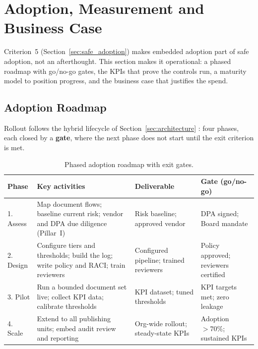 \documentclass[12pt,a4paper]{article}
\begin{document}
\section{Adoption, Measurement and Business Case}
\label{sec:adoption}

Criterion~5 (Section~\ref{sec:safe_adoption}) makes embedded adoption part of safe adoption, not an afterthought. This section makes it operational: a phased roadmap with go/no-go gates, the KPIs that prove the controls run, a maturity model to position progress, and the business case that justifies the spend.

\subsection{Adoption Roadmap}

Rollout follows the hybrid lifecycle of Section~\ref{sec:architecture} \cite{falchi_slides}: four phases, each closed by a \textbf{gate}, where the next phase does not start until the exit criterion is met.

\begin{table}[H]
\centering
\small
{}
\begin{tabular}{@{} p{2.0cm} p{4.7cm} p{3.4cm} p{3.4cm} @{}}
\toprule
\textbf{\color{accentdark}Phase} & \textbf{\color{accentdark}Key activities} & \textbf{\color{accentdark}Deliverable} & \textbf{\color{accentdark}Gate (go/no-go)} \\
\midrule
1. Assess & Map document flows; baseline current risk; vendor and DPA due diligence (Pillar~I) & Risk baseline; approved vendor & DPA signed; Board mandate \\
2. Design & Configure tiers and thresholds; build the log; write policy and RACI; train reviewers & Configured pipeline; trained reviewers & Policy approved; reviewers certified \\
3. Pilot & Run a bounded document set live; collect KPI data; calibrate thresholds & KPI dataset; tuned thresholds & KPI targets met; zero leakage \\
4. Scale & Extend to all publishing units; embed audit review and reporting & Org-wide rollout; steady-state KPIs & Adoption $>70\%$; sustained KPIs \\
\bottomrule
\end{tabular}
\caption{Phased adoption roadmap with exit gates.}
\label{tab:roadmap}
\end{table}
\end{document}
